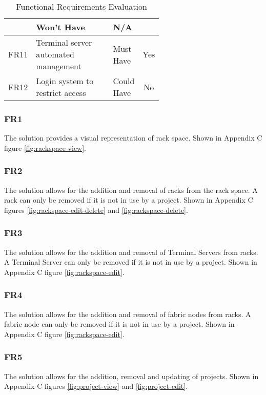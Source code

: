 \begin{center}
\begin{table}[H]
\begin{tabular}{l p{0.6\linewidth} l c}
                        & Won’t Have
                        & \cellcolor{red!25}N/A
            \\
            \hline
            FR11        & Terminal server automated management
                        & Must Have
                        & \cellcolor{green!25}Yes
            \\ \hline
            FR12        & Login system to restrict access                   &
            Could Have
                        & \cellcolor{red!25}No
            \\
        \end{tabular}
        \caption{Functional Requirements Evaluation}
        \label{table:evaluation-functional-requirements}
    \end{table}
\end{center}

\subsubsection{FR1}
The solution provides a visual representation of rack space. Shown in Appendix C figure \ref{fig:rackspace-view}.

\subsubsection{FR2}
The solution allows for the addition and removal of racks from the rack space. A rack can only be removed if it is not in use by a project. Shown in Appendix C figures \ref{fig:rackspace-edit-delete} and \ref{fig:rackspace-delete}.

\subsubsection{FR3}
The solution allows for the addition and removal of Terminal Servers from racks. A Terminal Server can only be removed if it is not in use by a project. Shown in Appendix C figure \ref{fig:rackspace-edit}.

\subsubsection{FR4}
The solution allows for the addition and removal of fabric nodes from racks. A fabric node can only be removed if it is not in use by a project. Shown in Appendix C figure \ref{fig:rackspace-edit}.

\subsubsection{FR5}
The solution allows for the addition, removal and updating of projects. Shown in Appendix C figures \ref{fig:project-view} and \ref{fig:project-edit}.

